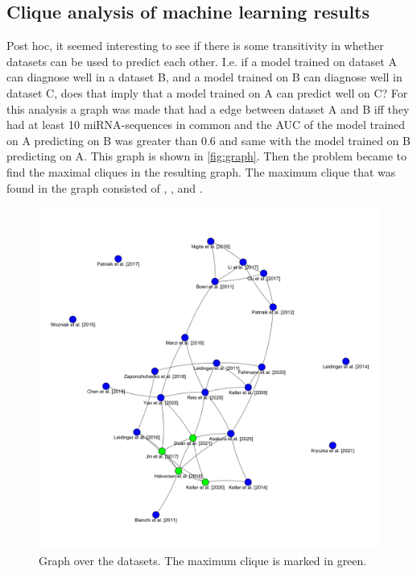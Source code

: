 \subsection{Clique analysis of machine learning results}
Post hoc, it seemed interesting to see if there is some transitivity in whether datasets can be used to predict each other. I.e. if a model trained on dataset A can diagnose well in a dataset B, and a model trained on B can diagnose well in dataset C, does that imply that a model trained on A can predict well on C? For this analysis a graph was made that had a edge between dataset A and B iff they had at least 10 miRNA-sequences in common and the AUC of the model trained on A predicting on  B was greater than 0.6 and same with the model trained on B predicting on A. This graph is shown in \autoref{fig:graph}. Then the problem became to find the maximal cliques in the resulting graph. The maximum clique that was found in the graph consisted of \citet{Duan2021}, \citet{Keller2020}, \citet{Jin2017} and \citet{Halvorsen2016}.


\begin{figure}
    \centering
    \includegraphics[width=\textwidth]{figs/graph}
    \caption{Graph over the datasets. The maximum clique is marked in green.}
    \label{fig:graph}
\end{figure}

